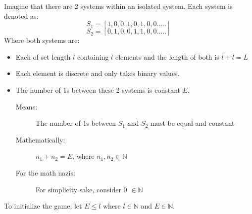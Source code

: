 \vspace{0,3cm}
Imagine that there are 2 systems within an isolated system. Each system is denoted as: 
$$S_{1}=[1,0,0,1,0,1,0,0.....]$$
$$S_{2}=[0,1,0,0,1,1,0,0.....]$$
\pagebreak
Where both systems are:
\begin{itemize}
    \item Each of set length $l$ containing $l$ elements and the length of both is $l+l=L$
    \item Each element is discrete and only takes binary values.
    \item The number of 1s between these 2 systems is constant $E$. 
    \begin{description}
     \item[Means: ] The number of 1s between $S_{1}$ and $S_{2}$ must be equal and constant
     \item[Mathematically:] $n_{1}+n_{2}=E$, where $n_{1},n_{2} \in \mathbb{N}$ 
     \item[For the math nazis:] For simplicity sake, consider 0 $\in \mathbb{N}$
     \end{description}
\end{itemize}
To initialize the game, let $E \leq l$ where $l \in \mathbb{N}$ and $ E \in \mathbb{N} $. \par

